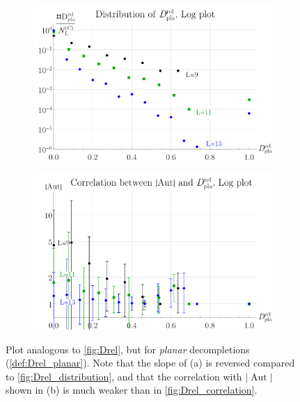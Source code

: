 \documentclass[11pt,a4paper]{article}
\newcommand{\abs}[1]{\lvert #1 \rvert}
\newcommand{\Aut}{\operatorname{Aut}}
\renewcommand{\|}{\rule[-0.4ex]{0.2ex}{1.2em}}
\begin{document}
\begin{figure}[htb]
	\centering
	\begin{subfigure}[b]{.47 \textwidth}
		\includegraphics[width=\textwidth]{Drelpla_distribution}
		\subcaption{}
		\label{fig:Drelpla_distribution}
	\end{subfigure}
	\begin{subfigure}[b]{.47 \textwidth}
		\includegraphics[width=\textwidth]{Drelpla_correlation}
		\subcaption{}
		\label{fig:Drelpla_correlation}
	\end{subfigure}
	\caption{Plot analogous to \cref{fig:Drel}, but for \emph{planar} decompletions (\cref{def:Drel_planar}). Note that the slope of (a) is reversed compared to \cref{fig:Drel_distribution}, and that the correlation with $\abs{\Aut}$ shown in (b) is much weaker than in \cref{fig:Drel_correlation}.}
	\label{fig:Drelpla}
\end{figure}
\end{document}
